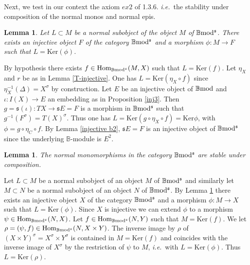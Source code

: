 \documentclass[12pt]{article}
\newtheorem{lem}[thm]{Lemma}
\def\Hom{{\rm Hom}}
\def\B{{\mathbb B}}
\newcommand{\ie}{{\it i.e.\/}\ }
\def\ker{{\mbox{Ker}}}
\def\Hom {{\mbox{Hom}}}
\def\yb{\mathfrak{s}}
\def\bmod{{\rm \B mod}}
\def\b2{{\rm \B mod^{\mathfrak s}}}
\begin{document}
  Next, we test in our context the axiom $ex2$ of  \cite{gra1} 1.3.6. \ie the stability under composition of the normal monos and normal epis. 
  \begin{lem}\label{normalsubinj} Let $L \subset M$ be a normal subobject of the object $M$ of $\b2$. There exists an injective object $F$ of the category $\b2$ and a morphism $\phi:M\to F$ such that $L=\ker(\phi)$.
\end{lem}
 \proof By hypothesis there exists $f\in \Hom_\b2(M,X)$ such that $L=\ker(f)$.  Let $\eta_X$  and $r$ be as in Lemma \ref{T-injective}. One has $L=\ker(\eta_X\circ f)$ since $\eta_X^{-1}(\Delta)=X^\sigma$ by construction. Let $E$ be an injective object of $\bmod$ and $\iota:I(X)\to E$ an embedding as in Proposition \ref{inj3}. Then $g=\yb(\iota):T X\to \yb E=F$ is a morphism in $\b2$ such that $g^{-1}(F^\sigma)=T(X)^\sigma$. Thus one has $L=\ker(g\circ \eta_X\circ f)=\ker \phi$, with $\phi= g\circ \eta_C\circ f$. By Lemma \ref{injective b2},  $\yb E=F$ is an injective object of $\b2$ since the underlying $\B$-module is $E^2$.  \endproof 
  \begin{lem}\label{normalmonos} The normal monomorphisms in the category $\b2$ are stable under composition.
\end{lem}
 \proof Let $L \subset M$ be a normal subobject of an object $M$ of $\b2$ and similarly let 
 $M \subset N$ be a normal subobject of an object $N$ of $\b2$. By Lemma \ref{normalsubinj} there exists an injective object $X$ of the category $\b2$ and a morphism $\phi:M\to X$ such that $L=\ker(\phi)$. Since $X$ is injective we can extend $\phi$ to a morphism $\psi\in \Hom_\b2(N,X)$. Let $f\in \Hom_\b2(N,Y)$ such that $M=\ker(f)$. We let $\rho=(\psi,f)\in \Hom_\b2(N,X\times Y)$. The inverse image by $\rho$ of $(X\times Y)^\sigma=X^\sigma\times Y^\sigma$ is contained in $M=\ker(f)$ and coincides with the inverse image of $X^\sigma$ by the restriction of $\psi$ to $M$, \ie with $L=\ker(\phi)$. Thus $L=\ker(\rho)$. \endproof
 
\end{document}

